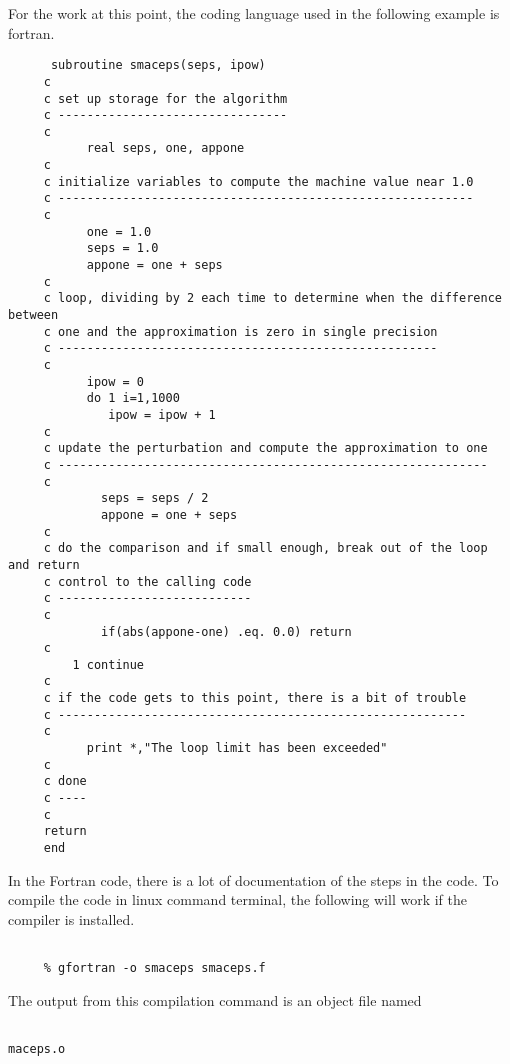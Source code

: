 \documentclass[10pt,fleqn]{article}
\begin{document}
For the work at this point, the coding language used in the following example
is fortran.
\begin{verbatim}
      subroutine smaceps(seps, ipow)
     c
     c set up storage for the algorithm
     c --------------------------------
     c
           real seps, one, appone
     c
     c initialize variables to compute the machine value near 1.0
     c ----------------------------------------------------------
     c
           one = 1.0
           seps = 1.0
           appone = one + seps
     c
     c loop, dividing by 2 each time to determine when the difference between
     c one and the approximation is zero in single precision
     c -----------------------------------------------------
     c
           ipow = 0
           do 1 i=1,1000
              ipow = ipow + 1
     c
     c update the perturbation and compute the approximation to one
     c ------------------------------------------------------------
     c
             seps = seps / 2
             appone = one + seps
     c
     c do the comparison and if small enough, break out of the loop and return
     c control to the calling code
     c ---------------------------
     c
             if(abs(appone-one) .eq. 0.0) return
     c
         1 continue
     c
     c if the code gets to this point, there is a bit of trouble
     c ---------------------------------------------------------
     c
           print *,"The loop limit has been exceeded"
     c
     c done
     c ----
     c
     return
     end
\end{verbatim}
In the Fortran code, there is a lot of documentation of the steps in the code.
To compile the code in linux command terminal, the following will work if the
compiler is installed.
\begin{verbatim}

     % gfortran -o smaceps smaceps.f

\end{verbatim}
The output from this compilation command is an object file named
\begin{verbatim}

maceps.o

\end{verbatim}
\end{document}
